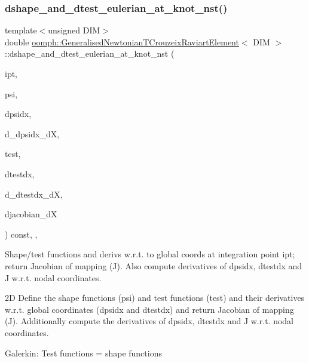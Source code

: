 \subsubsection{\texorpdfstring{dshape\+\_\+and\+\_\+dtest\+\_\+eulerian\+\_\+at\+\_\+knot\+\_\+nst()}{dshape\_and\_dtest\_eulerian\_at\_knot\_nst()}\hspace{0.1cm}{\footnotesize\ttfamily [2/2]}}
{\footnotesize\ttfamily template$<$unsigned D\+IM$>$ \\
double \hyperlink{classoomph_1_1GeneralisedNewtonianTCrouzeixRaviartElement}{oomph\+::\+Generalised\+Newtonian\+T\+Crouzeix\+Raviart\+Element}$<$ D\+IM $>$\+::dshape\+\_\+and\+\_\+dtest\+\_\+eulerian\+\_\+at\+\_\+knot\+\_\+nst (\begin{DoxyParamCaption}\item[{const unsigned \&}]{ipt,  }\item[{\hyperlink{classoomph_1_1Shape}{Shape} \&}]{psi,  }\item[{\hyperlink{classoomph_1_1DShape}{D\+Shape} \&}]{dpsidx,  }\item[{\hyperlink{classoomph_1_1RankFourTensor}{Rank\+Four\+Tensor}$<$ double $>$ \&}]{d\+\_\+dpsidx\+\_\+dX,  }\item[{\hyperlink{classoomph_1_1Shape}{Shape} \&}]{test,  }\item[{\hyperlink{classoomph_1_1DShape}{D\+Shape} \&}]{dtestdx,  }\item[{\hyperlink{classoomph_1_1RankFourTensor}{Rank\+Four\+Tensor}$<$ double $>$ \&}]{d\+\_\+dtestdx\+\_\+dX,  }\item[{\hyperlink{classoomph_1_1DenseMatrix}{Dense\+Matrix}$<$ double $>$ \&}]{djacobian\+\_\+dX }\end{DoxyParamCaption}) const\hspace{0.3cm}{\ttfamily [inline]}, {\ttfamily [protected]}, {\ttfamily [virtual]}}



Shape/test functions and derivs w.\+r.\+t. to global coords at integration point ipt; return Jacobian of mapping (J). Also compute derivatives of dpsidx, dtestdx and J w.\+r.\+t. nodal coordinates. 

2D Define the shape functions (psi) and test functions (test) and their derivatives w.\+r.\+t. global coordinates (dpsidx and dtestdx) and return Jacobian of mapping (J). Additionally compute the derivatives of dpsidx, dtestdx and J w.\+r.\+t. nodal coordinates.

Galerkin\+: Test functions = shape functions 

